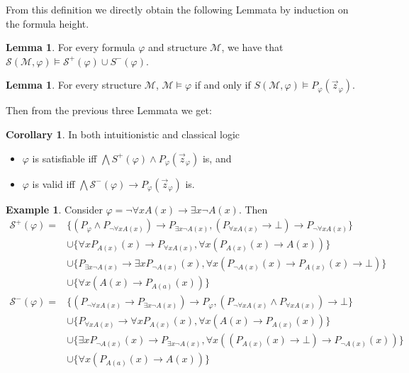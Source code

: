 \documentclass[a4paper,12pt]{report}
\theoremstyle{definition}
\theoremstyle{definition}
\newtheorem{corollary}[theorem]{Corollary}
\theoremstyle{definition}
\newtheorem{lemma}[theorem]{Lemma}
\theoremstyle{definition}
\theoremstyle{definition}
\theoremstyle{definition}
\newtheorem{example}[theorem]{Example}
\theoremstyle{definition}
\begin{document}
	From this definition we directly obtain the following Lemmata by induction on the formula height.
	\begin{lemma}\label{thm:struct1}
		For every formula $\varphi$ and structure $\mathcal M$, we have that $\mathcal S(\mathcal M, \varphi)\models\mathcal S^+(\varphi)\cup S^-(\varphi)$.
	\end{lemma}
	
	\begin{lemma}\label{thm:struct2}
		For every structure $\mathcal M$,
		$\mathcal M\models \varphi$ if and only if $S(\mathcal M, \varphi)\models P_\varphi(\vec z_\varphi)$.
	\end{lemma}
	
	Then from the previous three Lemmata we get:
	
	\begin{corollary}\label{eequivalid}
		In both intuitionistic and classical logic
		\begin{itemize}
			\item $\varphi$ is satisfiable iff $\mathcal \bigwedge S^+(\varphi)\wedge P_\varphi(\vec z_\varphi)$ is, and
			\item $\varphi$ is valid iff $\bigwedge\mathcal S^-(\varphi)\to P_\varphi(\vec z_\varphi)$ is.
		\end{itemize}
	\end{corollary}

	\begin{example}
		Consider $\varphi = \neg\forall x A(x)\to \exists x\neg A(x)$. Then
		\begin{align*}
			\mathcal S^+(\varphi) = &\{(P_\varphi\wedge P_{\neg\forall x A(x)})\to P_{\exists x\neg A(x)}, (P_{\forall xA(x)}\to\bot)\to P_{\neg \forall xA(x)}\}\\&\cup\{\forall xP_{A(x)}(x)\to P_{\forall xA(x)}, \forall x(P_{A(x)}(x)\to A(x))\}\\&\cup\{P_{\exists x\neg A(x)}\to \exists xP_{\neg A(x)}(x), \forall x(P_{\neg A(x)}(x)\to P_{A(x)}(x)\to \bot)\}\\&\cup\{\forall x(A(x)\to P_{A(a)}(x))\}\\
			\mathcal S^-(\varphi) = &\{(P_{\neg\forall x A(x)}\to P_{\exists x\neg A(x)})\to P_\varphi,  (P_{\neg \forall xA(x)}\wedge P_{\forall xA(x)})\to\bot\}\\&\cup\{P_{\forall xA(x)}\to \forall xP_{A(x)}(x), \forall x(A(x)\to P_{A(x)}(x))\}\\&\cup\{\exists xP_{\neg A(x)}(x)\to P_{\exists x\neg A(x)}, \forall x((P_{A(x)}(x)\to \bot)\to P_{\neg A(x)}(x))\}\\&\cup\{\forall x(P_{A(a)}(x)\to A(x))\}
		\end{align*}
	\end{example}
\end{document}
